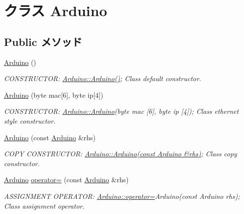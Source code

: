 \hypertarget{classArduino}{
\section{クラス Arduino}
\label{classArduino}
}
\subsection*{Public メソッド}
\begin{DoxyCompactItemize}
\item 
\hyperlink{classArduino_a625b4d718e488c7a7c13593b8abf9a43_a625b4d718e488c7a7c13593b8abf9a43}{Arduino} ()
\begin{DoxyCompactList}\small\item\em CONSTRUCTOR: \hyperlink{classArduino_a625b4d718e488c7a7c13593b8abf9a43_a625b4d718e488c7a7c13593b8abf9a43}{Arduino::Arduino()}; Class default constructor. \item\end{DoxyCompactList}\item 
\hyperlink{classArduino_af946ad1ba77bc602ee8e69923fb06e2d_af946ad1ba77bc602ee8e69923fb06e2d}{Arduino} (byte mac\mbox{[}6\mbox{]}, byte ip\mbox{[}4\mbox{]})
\begin{DoxyCompactList}\small\item\em CONSTRUCTOR: \hyperlink{classArduino_a625b4d718e488c7a7c13593b8abf9a43_a625b4d718e488c7a7c13593b8abf9a43}{Arduino::Arduino}(byte mac \mbox{[}6\mbox{]}, byte ip \mbox{[}4\mbox{]}); Class ethernet style constructor. \item\end{DoxyCompactList}\item 
\hyperlink{classArduino_abb555c50c1812b3b81211ffc490ff70f_abb555c50c1812b3b81211ffc490ff70f}{Arduino} (const \hyperlink{classArduino}{Arduino} \&rhs)
\begin{DoxyCompactList}\small\item\em COPY CONSTRUCTOR: \hyperlink{classArduino_abb555c50c1812b3b81211ffc490ff70f_abb555c50c1812b3b81211ffc490ff70f}{Arduino::Arduino(const Arduino \&rhs)}; Class copy constructor. \item\end{DoxyCompactList}\item 
\hyperlink{classArduino}{Arduino} \hyperlink{classArduino_af5f8c01c5fdf577706d231b56e060951_af5f8c01c5fdf577706d231b56e060951}{operator=} (const \hyperlink{classArduino}{Arduino} \&rhs)
\begin{DoxyCompactList}\small\item\em ASSIGNMENT OPERATOR: \hyperlink{classArduino_af5f8c01c5fdf577706d231b56e060951_af5f8c01c5fdf577706d231b56e060951}{Arduino::operator=}Arduino(const Arduino rhs); Class assignment operator. \item\end{DoxyCompactList}\item 

\end{DoxyCompactItemize}
